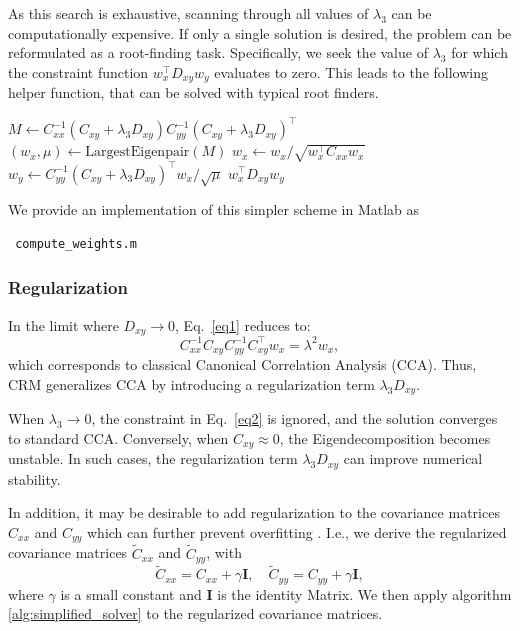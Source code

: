 \documentclass{article}
\begin{document}
As this search is exhaustive, scanning through all values of $\lambda_3$ can be computationally expensive. If only a single solution is desired, the problem can be reformulated as a root-finding task. Specifically, we seek the value of $\lambda_3$ for which the constraint function $w_x^\top D_{xy} w_y$ evaluates to zero. This leads to the following helper function, that can be solved with typical root finders.

\begin{algorithm}[H]
\caption{Simplified solver for CRM using root-finding.}\label{alg:simplified_solver}
\begin{algorithmic}
    \State $M \gets C_{xx}^{-1}(C_{xy} + \lambda_3 D_{xy}) C_{yy}^{-1}(C_{xy} + \lambda_3 D_{xy})^\top$
    \State $(w_x, \mu) \gets \text{LargestEigenpair}(M)$
    \State $w_x \gets w_x / \sqrt{w_x^\top C_{xx} w_x}$
    \State $w_y \gets C_{yy}^{-1}(C_{xy} + \lambda_3 D_{xy})^\top w_x / \sqrt{\mu}$
    \State \Return $w_x^\top D_{xy} w_y$
\EndProcedure
\end{algorithmic}
\end{algorithm}

We provide an implementation of this simpler scheme in Matlab as
\begin{verbatim} compute_weights.m \end{verbatim}


\subsubsection*{Regularization}

In the limit where $D_{xy} \to 0$, Eq.~\eqref{eq1} reduces to:
\[
C_{xx}^{-1} C_{xy} C_{yy}^{-1} C_{xy}^\top w_x = \lambda^2 w_x,
\]
which corresponds to classical Canonical Correlation Analysis (CCA). Thus, CRM generalizes CCA by introducing a regularization term $\lambda_3 D_{xy}$.

When $\lambda_3 \to 0$, the constraint in Eq.~\eqref{eq2} is ignored, and the solution converges to standard CCA. Conversely, when $C_{xy} \approx 0$, the Eigendecomposition becomes unstable. In such cases, the regularization term $\lambda_3 D_{xy}$ can improve numerical stability.


In addition, it may be desirable to add regularization to the covariance matrices $C_{xx}$ and $C_{yy}$ which can further prevent overfitting \cite{tuzhilinaCanonicalCorrelationAnalysis2023}. I.e., we derive the regularized covariance matrices $\tilde{C}_{xx}$ and $\tilde{C}_{yy}$, with
\[
\tilde{C}_{xx} = C_{xx} + \gamma \mathbf{I}, \quad \tilde{C}_{yy} = C_{yy} + \gamma \mathbf{I},
\]
where $\gamma$ is a small constant and $\mathbf{I}$ is the identity Matrix. We then apply algorithm \ref{alg:simplified_solver} to the regularized covariance matrices.
\end{document}
